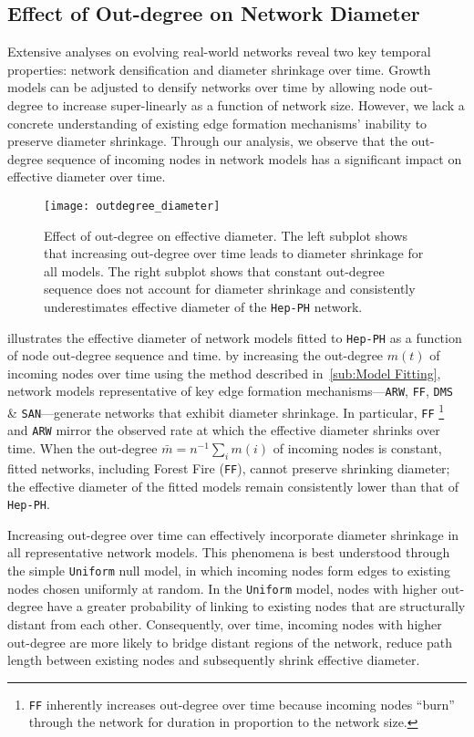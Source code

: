 \subsection{Effect of Out-degree on Network Diameter}
Extensive analyses \cite{hu2009evolution,mcglohon2011statistical,leskovec2005graphs} on evolving
real-world networks reveal two key temporal properties: network densification and diameter
shrinkage over time. Growth models can be adjusted to densify networks over time
by allowing node out-degree to increase super-linearly as a
function of network size. However, we lack a concrete understanding of existing
edge formation mechanisms' inability to preserve diameter shrinkage. Through our
analysis, we observe that the out-degree sequence of incoming nodes in
network models has a significant impact on effective diameter over time.
\begin{figure}[H]
 \vspace{-10pt}
 \centering
 \texttt{[image: outdegree\_diameter]}
 \caption{
 Effect of out-degree on effective diameter.
 The left subplot shows that increasing out-degree over time leads to diameter
 shrinkage for all models. The right subplot shows that
 constant out-degree sequence does not account for diameter
 shrinkage and consistently underestimates effective diameter of the \texttt{Hep-PH}
 network.}
 \label{fig:diameter}
 \vspace{-10pt}
\end{figure}

 illustrates the effective diameter of network models fitted
to \texttt{Hep-PH} as a function of node out-degree sequence and time.
by increasing the
out-degree $m(t)$ of incoming nodes over time using the method described
in~\cref{sub:Model Fitting}, network models representative of key edge formation
mechanisms---\texttt{ARW}, \texttt{FF}, \texttt{DMS} \&
\texttt{SAN}---generate networks that exhibit diameter shrinkage. In particular,
\texttt{FF} \footnote{\texttt{FF} inherently increases out-degree over time
because incoming nodes ``burn'' through the network for duration in proportion
to the network size.} and \texttt{ARW} mirror the observed rate at which the
effective diameter shrinks over time.
When the out-degree $\bar{m}=n^{-1}\sum_i m(i)$ of incoming nodes is constant,
fitted networks, including Forest Fire (\texttt{FF}), cannot preserve
shrinking diameter; the effective diameter of the fitted models remain
consistently lower than that of \texttt{Hep-PH}.

Increasing out-degree over time can effectively incorporate diameter shrinkage
in all representative network models. This phenomena is best understood through
the simple \texttt{Uniform} null model, in which incoming nodes form edges to
existing nodes chosen uniformly at random. In the \texttt{Uniform} model, nodes with higher out-degree
have a greater probability of linking to existing
nodes that are structurally distant from each other. Consequently, over time,
incoming nodes with higher out-degree are more likely to bridge distant regions
of the network, reduce path length between existing nodes and subsequently
shrink effective diameter.

